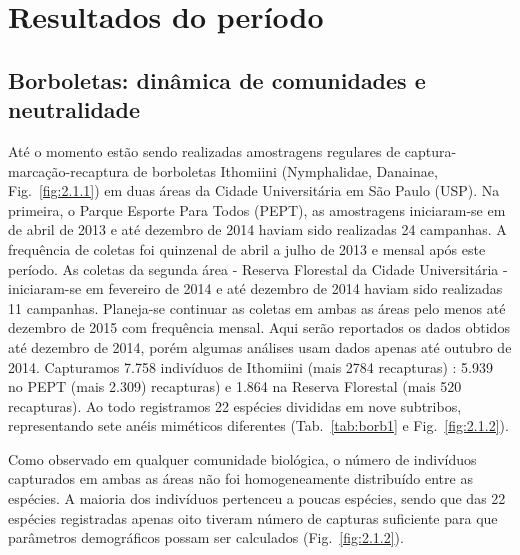 \documentclass[12pt, A4]{article}
\begin{document}
\section{Resultados do período}

\subsection{Borboletas: dinâmica de comunidades e neutralidade} %
\label{sec:dinamica-temporal-borb} 

Até o momento estão sendo realizadas amostragens regulares de
captura-marcação-recaptura de borboletas Ithomiini (Nymphalidae,
Danainae, Fig.~\ref{fig:2.1.1}) 
em duas áreas da Cidade Universitária em São Paulo (USP). Na
primeira, o Parque Esporte Para Todos (PEPT), as amostragens
iniciaram-se em de abril de 2013 e até dezembro de 2014 haviam sido
realizadas 24 campanhas. A frequência de coletas foi
quinzenal de abril a julho de 2013 e mensal após este
período. As coletas da segunda área - Reserva
Florestal da Cidade Universitária - iniciaram-se em fevereiro de 2014
e até dezembro de 2014 haviam sido realizadas 11 campanhas. Planeja-se
continuar as coletas em ambas as áreas pelo menos até dezembro de 2015
com frequência mensal. Aqui serão reportados os dados obtidos até
dezembro de 2014, porém algumas análises usam dados apenas até outubro de 2014.
Capturamos 7.758 indivíduos de Ithomiini (mais 2784 recapturas) : 
5.939 no PEPT (mais 2.309) recapturas) e 1.864 na Reserva Florestal (mais 520 recapturas). 
Ao todo registramos 22 espécies divididas em nove subtribos, 
representando sete anéis miméticos diferentes (Tab.~\ref{tab:borb1} e Fig.~\ref{fig:2.1.2}).

Como observado em qualquer comunidade biológica, o número de
indivíduos capturados em ambas as áreas não foi homogeneamente
distribuído entre as espécies. A maioria dos indivíduos pertenceu a
poucas espécies, sendo que das 22 espécies registradas apenas oito
tiveram número de capturas
suficiente para que parâmetros demográficos possam ser calculados
(Fig.~\ref{fig:2.1.2}). 
\end{document}
